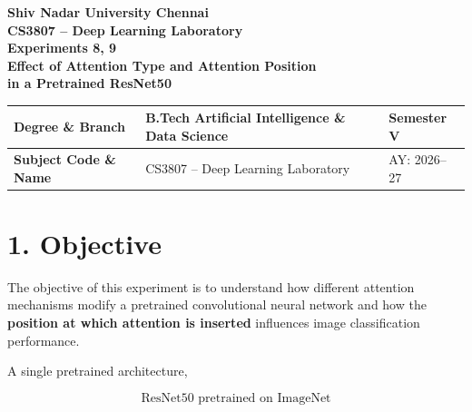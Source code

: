 \documentclass[10pt]{article}
\begin{document}

\begin{center}

{\large\textbf{Shiv Nadar University Chennai}}\\[2mm]

{\normalsize\textbf{CS3807 -- Deep Learning Laboratory}}\\[2mm]

{\large\textbf{Experiments 8, 9}}\\[1mm]

{\normalsize
\textbf{
Effect of Attention Type and Attention Position\\
in a Pretrained ResNet50
}}

\end{center}

\vspace{3mm}


\begin{center}
\begin{tabular}{|p{3.5cm}|p{8.7cm}|p{2.1cm}|}
\hline
\textbf{Degree \& Branch}
&
B.Tech Artificial Intelligence \& Data Science
&
Semester V
\\
\hline

\textbf{Subject Code \& Name}
&
CS3807 -- Deep Learning Laboratory
&
AY: 2026--27
\\
\hline
\end{tabular}
\end{center}

\section*{1. Objective}

The objective of this experiment is to understand how different attention
mechanisms modify a pretrained convolutional neural network and how the
\textbf{position at which attention is inserted} influences image
classification performance.

A single pretrained architecture,

\[
\boxed{\text{ResNet50 pretrained on ImageNet}}
\]
\end{document}
